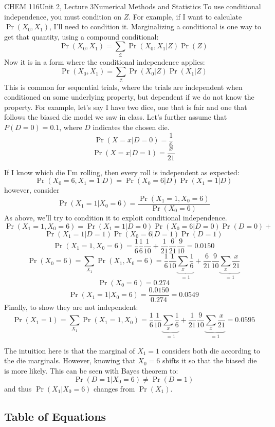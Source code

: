 \documentclass{article}
\begin{document}
\begin{tdoc}{CHEM 116}{Unit 2, Lecture 3}{Numerical Methods and Statistics}
To use conditional independence, you must condition on $Z$. For
example, if I want to calculate $\Pr(X_0, X_1)$, I'll need to
condition it. Marginalizing a conditional is one way to get that
quantity, using a compound conditional:
\[
\Pr(X_0, X_1) = \sum_\mathcal{Z}\Pr(X_0, X_1 | Z) \Pr(Z)
\]
Now it is in a form where the conditional independence applies:
\[
\Pr(X_0, X_1) = \sum_\mathcal{Z}\Pr(X_0 | Z) \Pr(X_1 | Z)
\]
This is common for sequential trials, where the trials are independent
when conditioned on some underlying property, but dependent if we do
not know the property. For example, let's say I have two dice, one
that is fair and one that follows the biased die model we saw in
class. Let's further assume that $P(D = 0) = 0.1$, where $D$ indicates
the chosen die.
\[
\Pr(X=x | D = 0) = \frac{1}{6}
\]
\[
\Pr(X=x | D = 1) = \frac{x}{21}
\]

If I know which die I'm rolling, then every roll is independent
as expected:
\[
\Pr (X_0 = 6, X_1 = 1 | D) = \Pr (X_0 = 6 | D) \Pr (X_1 = 1 | D)
\]
however, consider
\[
\Pr (X_1 = 1 | X_0 = 6) = \frac{\Pr(X_1 = 1, X_0 = 6)}{\Pr (X_0 = 6)}
\]
As above, we'll try to condition it to exploit conditional
independence.
\[
\Pr(X_1 = 1, X_0 = 6) = \Pr(X_1 = 1 | D = 0) \Pr(X_0 = 6 | D = 0) \Pr (D = 0) +
\]
\[
\Pr(X_1 = 1 | D = 1) \Pr(X_0 = 6 | D = 1) \Pr (D = 1)
\]
\[
\Pr(X_1 = 1, X_0 = 6) = \frac{1}{6}\frac{1}{6}\frac{1}{10} + \frac{1}{21}\frac{6}{21}\frac{9}{10} = 0.0150
\]
\[
\Pr(X_0 = 6) = \sum_{X_1} \Pr(X_1, X_0 = 6) = \frac{1}{6}\frac{1}{10}\underbrace{\sum_{x} \frac{1}{6}}_{=1} + \frac{6}{21}\frac{9}{10} \underbrace{\sum_{x} \frac{x}{21}}_{=1}
\]
\[
\Pr(X_0 = 6)  = 0.274
\]
\[
\Pr (X_1 = 1 | X_0 = 6) = \frac{0.0150}{0.274} = 0.0549
\]
Finally, to show they are not independent:
\[
\Pr(X_1 = 1) = \sum_{X_1} \Pr(X_1 = 1, X_0) = \frac{1}{6}\frac{1}{10}\underbrace{\sum_{x} \frac{1}{6}}_{=1} + \frac{1}{21}\frac{9}{10} \underbrace{\sum_{x} \frac{x}{21}}_{=1} = 0.0595
\]

The intuition here is that the marginal of $X_1 = 1$ considers both
die according to the die marginals. However, knowing that $X_0 = 6$
shifts it so that the biased die is more likely. This can be seen with
Bayes theorem to:
\[
\Pr(D = 1 | X_0 = 6) \neq \Pr (D=1)
\]
and thus $\Pr (X_1 | X_0 = 6)$ changes from $\Pr(X_1)$.

\subsection{Table of Equations}


\end{tdoc}
\end{document}
